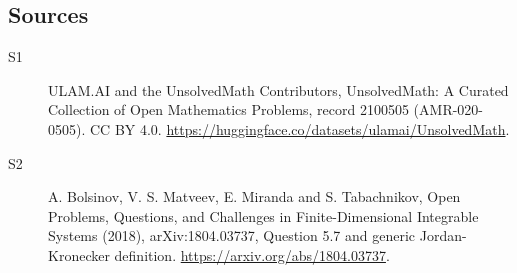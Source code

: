 \documentclass[11pt]{article}
\begin{document}
\subsection{Sources}
\begin{description}
\item[\hypertarget{source:2100505:1}{S1}] ULAM.AI and the UnsolvedMath Contributors, UnsolvedMath: A Curated Collection of Open Mathematics Problems, record 2100505 (AMR-020-0505). CC BY 4.0. \url{https://huggingface.co/datasets/ulamai/UnsolvedMath}.
\item[\hypertarget{source:2100505:2}{S2}] A. Bolsinov, V. S. Matveev, E. Miranda and S. Tabachnikov, Open Problems, Questions, and Challenges in Finite-Dimensional Integrable Systems (2018), arXiv:1804.03737, Question 5.7 and generic Jordan-Kronecker definition. \url{https://arxiv.org/abs/1804.03737}.
\end{description}
\label{end:2100505}
\end{document}
